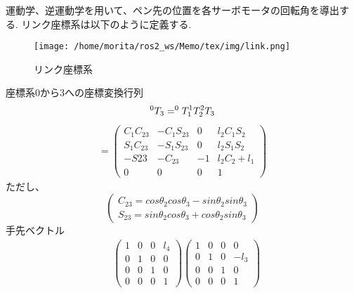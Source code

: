 \documentclass[a4j]{jarticle}			%
\begin{document}
運動学、逆運動学を用いて、ペン先の位置を各サーボモータの回転角を導出する.
リンク座標系は以下のように定義する.
\begin{figure}[htbp]
\begin{center}
\texttt{[image: /home/morita/ros2\_ws/Memo/tex/img/link.png]}
\caption{リンク座標系}
\end{center}
\end{figure}

\begin{multicols}{2} %

座標系0から3への座標変換行列 
\small
$$
	^{0}T_{3}=^{0}T_{1} ^{1}T_{2} ^{2}T_{3} \\
$$
\begin{equation*}
	\begin{array}{cc}
		=
		\left( 
			\begin{array}{cccc}
				C_1C_{23} & -C_1S_{23} & 0 & l_2C_1S_2 \\
				S_1C_{23} & -S_1S_{23} & 0 & l_2S_1S_2 \\
				-S{23} & -C_{23} & -1 & l_2C_2 + l_1 \\
				0 & 0 & 0 & 1 
			\end{array}
		\right)
	\end{array}
\end{equation*}
\normalsize
ただし、
\begin{equation*}
	\left(
	\begin{split}
		C_{23} = cos\theta_2cos\theta_3-sin\theta_2sin\theta_3\\
		S_{23} = sin\theta_2cos\theta_3+cos\theta_2sin\theta_3	
	\end{split}
	\right)
\end{equation*}
\normalsize
手先ベクトル
\tiny
\begin{equation*}
	\begin{array}{cccc}
		&\left( 
			\begin{array}{cccc}
				1 & 0 & 0 & l_4\\
				0 & 1 & 0 & 0\\
				0 & 0 & 1 & 0\\
				0 & 0 & 0 & 1 
			\end{array}
		\right)
		\left( 
			\begin{array}{cccc}
				1 & 0 & 0 & 0\\
				0 & 1 & 0 & -l_3\\
				0 & 0 & 1 & 0\\
				0 & 0 & 0 & 1 
			\end{array}
			\right)\\

\end{array}
\end{equation*}
\end{multicols}
\end{document}
